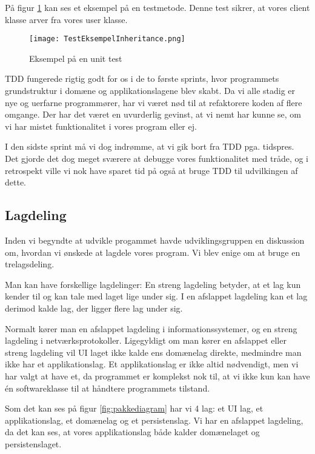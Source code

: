 På figur \ref{fig:TDD} kan ses et eksempel på en testmetode.
Denne test sikrer, at vores client klasse arver fra vores user klasse.

\begin{figure}[H]
    \caption{Eksempel på en unit test}
    \centering
        \texttt{[image: TestEksempelInheritance.png]}
    \label{fig:TDD}
\end{figure}

TDD fungerede rigtig godt for os i de to første sprints, hvor programmets grundstruktur i domæne og applikationslagene blev skabt.
Da vi alle stadig er nye og uerfarne programmører, har vi været nød til at refaktorere koden af flere omgange.
Der har det været en uvurderlig gevinst, at vi nemt har kunne se, om vi har mistet funktionalitet i vores program eller ej.

I den sidste sprint må vi dog indrømme, at vi gik bort fra TDD pga. tidspres.
Det gjorde det dog meget sværere at debugge vores funktionalitet med tråde, og i retrospekt ville vi nok have sparet tid på også at bruge TDD til udvilkingen af dette.

\subsection{Lagdeling}
\label{lagdeling}

Inden vi begyndte at udvikle progammet havde udviklingsgruppen en diskussion om, hvordan vi ønskede at lagdele vores program.
Vi blev enige om at bruge en trelagsdeling.

Man kan have forskellige lagdelinger:
En streng lagdeling betyder, at et lag kun kender til og kan tale med laget lige under sig.
I en afslappet lagdeling kan et lag derimod kalde lag, der ligger flere lag under sig.\cite{larman}

Normalt kører man en afslappet lagdeling i informationssystemer, og en streng lagdeling i netværksprotokoller.
Ligegyldigt om man kører en afslappet eller streng lagdeling vil UI laget ikke kalde ens domænelag direkte, medmindre man ikke har et applikationslag.
Et applikationslag er ikke altid nødvendigt, men vi har valgt at have et, da programmet er komplekst nok til, at vi ikke kun kan have én softwareklasse til at håndtere programmets tilstand.\cite{larman}

Som det kan ses på figur \ref{fig:pakkediagram} har vi 4 lag: et UI lag, et applikationslag, et domænelag og et persistenslag.
Vi har en afslappet lagdeling, da det kan ses, at vores applikationslag både kalder domænelaget og persistenslaget.

